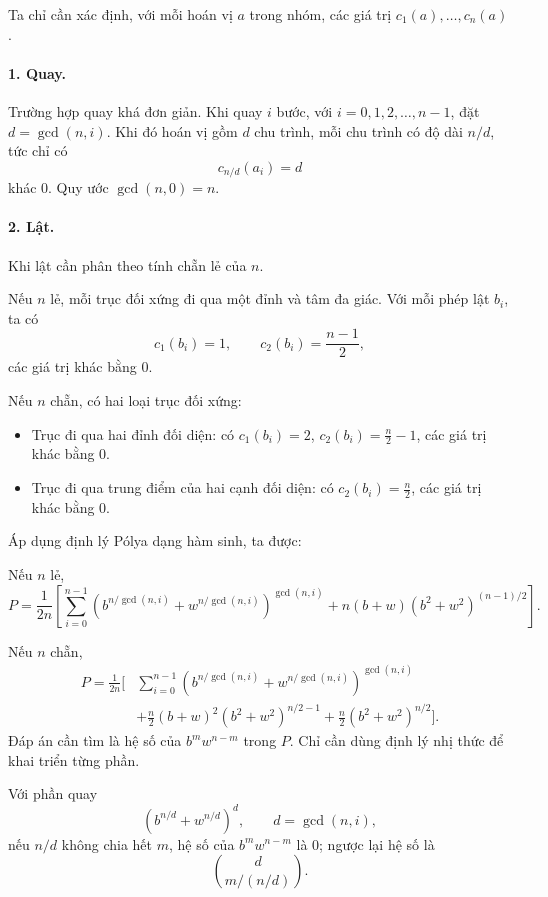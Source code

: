 \documentclass[11pt]{article}
\newcommand{\C}[2]{\binom{#1}{#2}}
\begin{document}
Ta chỉ cần xác định, với mỗi hoán vị \(a\) trong nhóm, các giá trị
\(c_1(a),\ldots,c_n(a)\).

\paragraph{1. Quay.}
Trường hợp quay khá đơn giản. Khi quay \(i\) bước, với
\(i=0,1,2,\ldots,n-1\), đặt \(d=\gcd(n,i)\). Khi đó hoán vị gồm \(d\) chu
trình, mỗi chu trình có độ dài \(n/d\), tức chỉ có
\[
  c_{n/d}(a_i)=d
\]
khác \(0\). Quy ước \(\gcd(n,0)=n\).

\paragraph{2. Lật.}
Khi lật cần phân theo tính chẵn lẻ của \(n\).

Nếu \(n\) lẻ, mỗi trục đối xứng đi qua một đỉnh và tâm đa giác. Với mỗi phép
lật \(b_i\), ta có
\[
  c_1(b_i)=1,\qquad c_2(b_i)=\frac{n-1}{2},
\]
các giá trị khác bằng \(0\).

Nếu \(n\) chẵn, có hai loại trục đối xứng:
\begin{itemize}
  \item Trục đi qua hai đỉnh đối diện: có
  \(c_1(b_i)=2\), \(c_2(b_i)=\frac n2-1\), các giá trị khác bằng \(0\).
  \item Trục đi qua trung điểm của hai cạnh đối diện: có
  \(c_2(b_i)=\frac n2\), các giá trị khác bằng \(0\).
\end{itemize}

Áp dụng định lý Pólya dạng hàm sinh, ta được:

Nếu \(n\) lẻ,
\[
  P=\frac1{2n}\left[
    \sum_{i=0}^{n-1}
      \left(b^{n/\gcd(n,i)}+w^{n/\gcd(n,i)}\right)^{\gcd(n,i)}
    +n(b+w)(b^2+w^2)^{(n-1)/2}
  \right].
\]

Nếu \(n\) chẵn,
\[
\begin{aligned}
  P=\frac1{2n}\Bigg[
    &\sum_{i=0}^{n-1}
      \left(b^{n/\gcd(n,i)}+w^{n/\gcd(n,i)}\right)^{\gcd(n,i)}\\
    &+\frac n2(b+w)^2(b^2+w^2)^{n/2-1}
     +\frac n2(b^2+w^2)^{n/2}
  \Bigg].
\end{aligned}
\]
Đáp án cần tìm là hệ số của \(b^m w^{n-m}\) trong \(P\). Chỉ cần dùng định lý
nhị thức để khai triển từng phần.

Với phần quay
\[
  \left(b^{n/d}+w^{n/d}\right)^d,\qquad d=\gcd(n,i),
\]
nếu \(n/d\) không chia hết \(m\), hệ số của \(b^mw^{n-m}\) là \(0\); ngược
lại hệ số là
\[
  \C{d}{m/(n/d)}.
\]
\end{document}
